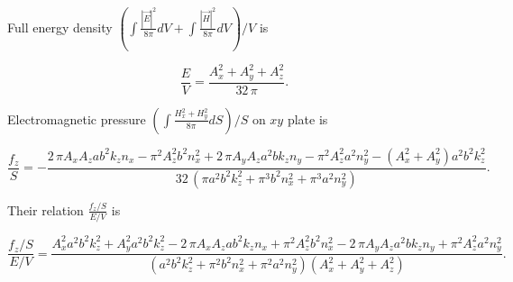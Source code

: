 \documentclass[twoside, 10pt]{article}
\begin{document}
\begin{multicols}{2}
    Full energy density
\(\left(\int \frac{|\vec{E}|^2}{8 \pi}dV + \int \frac{|\vec{H}|^2}{8 \pi}dV\right)\big/{V}\)
is

\begin{equation}\frac{E}{V} = \frac{{A_{x}^{2} + A_{y}^{2} + A_{z}^{2}}}{32 \, \pi}.\end{equation}

    Electromagnetic pressure
\(\left({\int \frac {H_x^2+H_y^2}{8 \pi} dS}\right)\big/{S}\) on \(xy\)
plate is

\end{multicols}


\begin{equation}\frac{f_z}{S} = -\frac{2 \, \pi A_{x} A_{z} a b^{2} k_{z} n_{x} - \pi^{2} A_{z}^{2} b^{2} n_{x}^{2} + 2 \, \pi A_{y} A_{z} a^{2} b k_{z} n_{y} - \pi^{2} A_{z}^{2} a^{2} n_{y}^{2} - {\left(A_{x}^{2} + A_{y}^{2}\right)} a^{2} b^{2} k_{z}^{2}}{32 \, {\left(\pi a^{2} b^{2} k_{z}^{2} + \pi^{3} b^{2} n_{x}^{2} + \pi^{3} a^{2} n_{y}^{2}\right)}}.\end{equation}

    Their relation \(\frac{f_z/S}{E/V}\) is

\begin{equation}\frac{f_z/S}{E/V} = \frac{A_{x}^{2} a^{2} b^{2} k_{z}^{2} + A_{y}^{2} a^{2} b^{2} k_{z}^{2} - 2 \, \pi A_{x} A_{z} a b^{2} k_{z} n_{x} + \pi^{2} A_{z}^{2} b^{2} n_{x}^{2} - 2 \, \pi A_{y} A_{z} a^{2} b k_{z} n_{y} + \pi^{2} A_{z}^{2} a^{2} n_{y}^{2}}{{\left(a^{2} b^{2} k_{z}^{2} + \pi^{2} b^{2} n_{x}^{2} + \pi^{2} a^{2} n_{y}^{2}\right)} {\left(A_{x}^{2} + A_{y}^{2} + A_{z}^{2}\right)}}.\end{equation}
\end{document}

